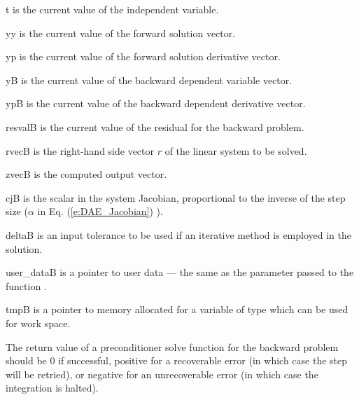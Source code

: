 {  
  \begin{args}
  \item[t]
    is the current value of the independent variable.
  \item[yy]
    is the current value of the forward solution vector.
  \item[yp]
    is the current value of the forward solution derivative vector.
  \item[yB]
    is the current value of the backward dependent variable vector.
  \item[ypB]
    is the current value of the backward dependent derivative vector.
  \item[resvalB]
    is the current value of the residual for the backward problem.
  \item[rvecB]
    is the right-hand side vector $r$ of the linear system to be solved.
  \item[zvecB]
    is the computed output vector.
  \item[cjB]
    is the scalar in the system Jacobian, proportional to the inverse of the
    step size ($\alpha$ in Eq. (\ref{e:DAE_Jacobian}) ).
  \item[deltaB]
    is an input tolerance to be used if an iterative method 
    is employed in the solution.
  \item[user\_dataB]
    is a pointer to user data --- the same as the       
    parameter passed to the function .
  \item[tmpB]
    is a pointer to memory allocated for a variable of type    
     which can be used for work space.
  \end{args}
}
{
  The return value of a preconditioner solve function for the backward
  problem should be $0$ if successful, 
  positive for a recoverable error (in which case the step will be retried), or
  negative for an unrecoverable error (in which case the integration is halted).
}
{}

